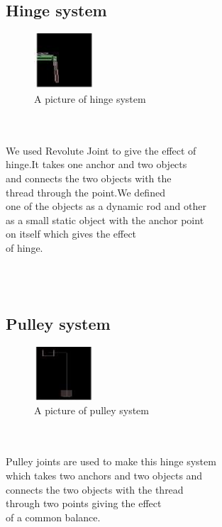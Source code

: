 \subsection{Hinge system}
\begin{figure}
	\caption{A picture of hinge system}
	\centering
	 \includegraphics[width=0.2\textwidth]{hingesystem.jpg}%
\end{figure}
\begin{frame}
\centering
\\
\\
We used Revolute Joint to give the effect of\\ hinge.It takes one anchor and two objects\\ and connects the two objects with the\\ thread through the point.We defined\\ one of the objects as a dynamic rod and other\\ as a small static object with the anchor point\\ on itself which gives the effect\\ of hinge.
\end{frame}
\\
\\
\newpage
\subsection{Pulley system}
\begin{figure}
	\caption{A picture of pulley system}
	\centering
	 \includegraphics[width=0.2\textwidth]{pulleysystem.jpg}%
\end{figure}
\begin{frame}
\centering
\\
\\
Pulley joints are used to make this hinge system\\which takes two anchors and two objects and \\connects the two objects with the thread\\ through two points giving the effect\\ of a common balance.
\end{frame}
\\
\\






